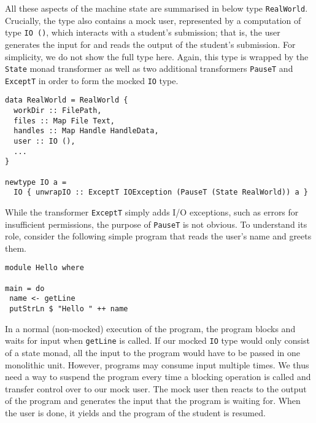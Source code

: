 All these aspects of the machine state are summarised in below type \texttt{RealWorld}.
Crucially, the type also contains a mock user,
represented by a computation of type \texttt{IO ()},
which interacts with a student's submission;
that is, the user generates the input for and reads the output of the student's submission.
For simplicity, we do not show the full type here.
Again, this type is wrapped by the \texttt{State} monad transformer as well as two additional transformers \texttt{PauseT} and \texttt{ExceptT} in order to form the mocked \texttt{IO} type.
\begin{verbatim}
data RealWorld = RealWorld {
  workDir :: FilePath,
  files :: Map File Text,
  handles :: Map Handle HandleData,
  user :: IO (),
  ...
}

newtype IO a =
  IO { unwrapIO :: ExceptT IOException (PauseT (State RealWorld)) a }
\end{verbatim}
While the transformer \texttt{ExceptT} simply adds I/O exceptions,
such as errors for insufficient permissions,
the purpose of \texttt{PauseT} is not obvious.
To understand its role, consider the following simple program that reads the user's name and greets them.
\begin{verbatim}
module Hello where

main = do
 name <- getLine
 putStrLn $ "Hello " ++ name
\end{verbatim}
In a normal (non-mocked) execution of the program, the program blocks and waits for input when \texttt{getLine} is called.
If our mocked \texttt{IO} type would only consist of a state monad,
all the input to the program would have to be passed in one monolithic unit.
However, programs may consume input multiple times.
We thus need a way to suspend the program every time a blocking operation is called and transfer control over to our mock user.
The mock user then reacts to the output of the program and generates the input that the program is waiting for.
When the user is done, it yields and the program of the student is resumed.


